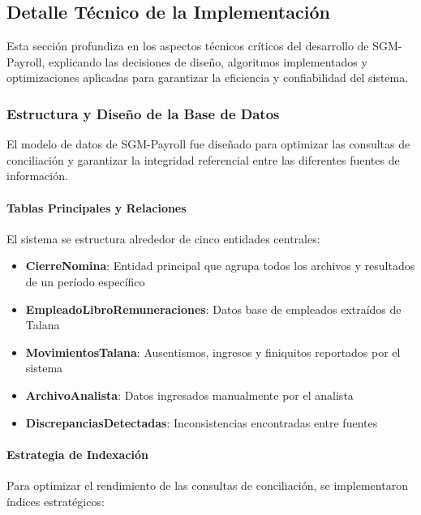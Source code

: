 
\subsection{Detalle Técnico de la Implementación}

Esta sección profundiza en los aspectos técnicos críticos del desarrollo de SGM-Payroll, explicando las decisiones de diseño, algoritmos implementados y optimizaciones aplicadas para garantizar la eficiencia y confiabilidad del sistema.

\subsubsection{Estructura y Diseño de la Base de Datos}

El modelo de datos de SGM-Payroll fue diseñado para optimizar las consultas de conciliación y garantizar la integridad referencial entre las diferentes fuentes de información.

\paragraph{Tablas Principales y Relaciones}

El sistema se estructura alrededor de cinco entidades centrales:

\begin{itemize}
    \item \textbf{CierreNomina}: Entidad principal que agrupa todos los archivos y resultados de un período específico
    \item \textbf{EmpleadoLibroRemuneraciones}: Datos base de empleados extraídos de Talana
    \item \textbf{MovimientosTalana}: Ausentismos, ingresos y finiquitos reportados por el sistema
    \item \textbf{ArchivoAnalista}: Datos ingresados manualmente por el analista
    \item \textbf{DiscrepanciasDetectadas}: Inconsistencias encontradas entre fuentes
\end{itemize}

\paragraph{Estrategia de Indexación}

Para optimizar el rendimiento de las consultas de conciliación, se implementaron índices estratégicos:

